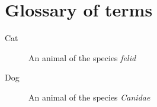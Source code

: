 \documentclass[11pt]{book}
\begin{document}
\maketitle
\fi


\chapter{Glossary of terms}   

\begin{description}
\item[Cat]An animal of the species {\em felid }
\item[Dog]An animal of the species {\em Canidae} 
\end{description}

\ifx\collected\undefined
\newcommand{\collected}{\true}

\end{document}
